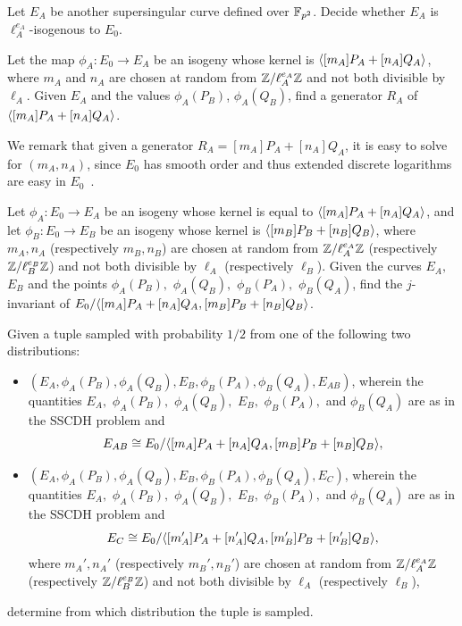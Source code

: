 \begin{problem} Let
  $E_A$ be another supersingular curve defined over
  ${\mathbb{F}}_{p^2}$. Decide whether $E_A$ is $\ell_A^{e_A}$-isogenous to
  $E_0$.
\end{problem}

\begin{problem}
Let the map $\phi_A \colon E_0 \to E_A$ be an isogeny whose kernel is
${\langle [m_A]P_A+[n_A]Q_A \rangle}$, where $m_A$ and $n_A$ are chosen at random
from ${\mathbb{Z}}/\ell_A^{e_A}{\mathbb{Z}}$ and not both divisible by $\ell_A$.  Given
$E_A$ and the values $\phi_A(P_B)$, $\phi_A(Q_B)$, find a generator
$R_A$ of ${\langle [m_A]P_A+[n_A]Q_A \rangle}$.
\end{problem}

We remark that given a generator $R_A = [m_A]P_A+[n_A]Q_A$, it is easy
to solve for $(m_A,n_A)$, since $E_0$ has smooth order and thus
extended discrete logarithms are easy in $E_0$~\cite{teske-ph}.

\begin{problem} Let $\phi_A \colon E_0 \to E_A$ be an isogeny
  whose kernel is equal to ${\langle [m_A]P_A+[n_A]Q_A \rangle}$, and let $\phi_B \colon
  E_0 \to E_B$ be an isogeny whose kernel is
  ${\langle [m_B]P_B+[n_B]Q_B \rangle}$, where $m_A,n_A$ (respectively $m_B,n_B$)
  are chosen at random from ${\mathbb{Z}}/\ell_A^{e_A}{\mathbb{Z}}$ (respectively
  ${\mathbb{Z}}/\ell_B^{e_B}{\mathbb{Z}}$) and not both divisible by $\ell_A$ (respectively
  $\ell_B$). Given the curves $E_A,$ $E_B$ and the points
  $\phi_A(P_B),$ $\phi_A(Q_B),$ $\phi_B(P_A),$ $\phi_B(Q_A)$, find the
  $j$-invariant of $E_0/{\langle [m_A]P_A+[n_A]Q_A ,[m_B]P_B+[n_B]Q_B \rangle}$.
\end{problem}

\begin{problem} Given a tuple sampled with probability $1/2$ from one of
  the following two distributions:
\begin{itemize} 
\item $(E_A, \phi_A(P_B), \phi_A(Q_B), E_B, \phi_B(P_A), \phi_B(Q_A),
  E_{AB})$, wherein the quantities $E_A,$ $\phi_A(P_B),$ $\phi_A(Q_B),$ $E_B,$
  $\phi_B(P_A),$ and $\phi_B(Q_A)$ are as in the SSCDH problem and \[E_{AB} \cong
  E_0/{\langle [m_A]P_A+[n_A]Q_A ,[m_B]P_B+[n_B]Q_B \rangle},\]
\item $(E_A, \phi_A(P_B), \phi_A(Q_B), E_B, \phi_B(P_A), \phi_B(Q_A),
  E_C)$, wherein the quantities $E_A,$ $\phi_A(P_B),$ $\phi_A(Q_B),$ $E_B,$
  $\phi_B(P_A),$ and $\phi_B(Q_A)$ are as in the SSCDH problem and \[E_{C} \cong
  E_0/{\langle [m_A']P_A+[n_A']Q_A ,[m_B']P_B+[n_B']Q_B \rangle},\] where
  $m_A',n_A'$ (respectively $m_B',n_B'$) are chosen at random from
  ${\mathbb{Z}}/\ell_A^{e_A}{\mathbb{Z}}$ (respectively ${\mathbb{Z}}/\ell_B^{e_B}{\mathbb{Z}}$) and not both
  divisible by $\ell_A$ (respectively $\ell_B$),
\end{itemize}
determine from which distribution the tuple is sampled.
\end{problem}

